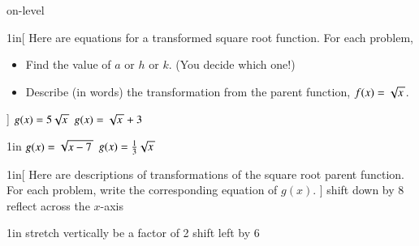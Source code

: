 \begin{taggedblock}{on-level}

\begin{my2Problems}[\normalsize]{1in}[%
    Here are equations for a transformed square root function.
    For each problem,
    \vspace{-1em}
    \begin{itemize}[nosep]
        \item Find the value of $a$ or $h$ or $k$. (You decide which one!)
        \item Describe (in words) the transformation from the parent function, $f(x)=\myRoot{x}$.
    \end{itemize}
    ]
    {
        $g(x) = 5 \myRoot{x}$
    }
    {
        $g(x) = \myRoot{x} + 3$
    }
\end{my2Problems}
\begin{my2Problems}[\normalsize]{1in}
    {
        $g(x) = \myRoot{x-7}$
    }
    {
        $g(x) = \frac{1}{3}\myRoot{x}$
    }
\end{my2Problems}



\begin{my2Problems}[\normalsize]{1in}[%
    Here are descriptions of transformations of the square root parent function.
    For each problem, write the corresponding equation of $g(x)$.
    ]
    {
        shift down by 8
    }
    {
        reflect across the $x$-axis
    }
\end{my2Problems}
\begin{my2Problems}[\normalsize]{1in}
    {
        stretch vertically be a factor of 2
    }
    {
        shift left by 6
    }
\end{my2Problems}


\end{taggedblock}

